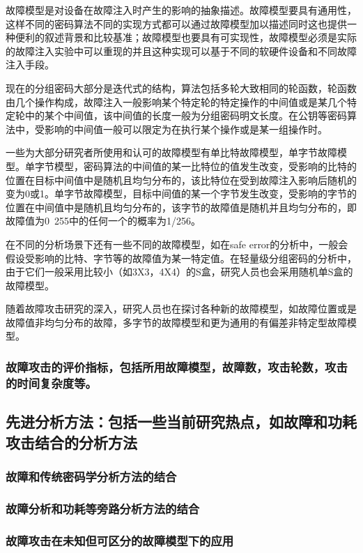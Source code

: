 \documentclass[a4paper,12pt]{article}
\begin{document}
\begin{CJK}{UTF8}{gkai}
故障模型是对设备在故障注入时产生的影响的抽象描述。故障模型要具有通用性，这样不同的密码算法不同的实现方式都可以通过故障模型加以描述同时这也提供一种便利的叙述背景和比较基准；故障模型也要具有可实现性，故障模型必须是实际的故障注入实验中可以重现的并且这种实现可以基于不同的软硬件设备和不同故障注入手段。

现在的分组密码大部分是迭代式的结构，算法包括多轮大致相同的轮函数，轮函数由几个操作构成，故障注入一般影响某个特定轮的特定操作的中间值或是某几个特定轮中的某个中间值，该中间值的长度一般为分组密码明文长度。在公钥等密码算法中，受影响的中间值一般可以限定为在执行某个操作或是某一组操作时。

一些为大部分研究者所使用和认可的故障模型有单比特故障模型，单字节故障模型。单字节模型，密码算法的中间值的某一比特位的值发生改变，受影响的比特的位置在目标中间值中是随机且均匀分布的，该比特位在受到故障注入影响后随机的变为0或1。单字节故障模型，目标中间值的某一个字节发生改变，受影响的字节的位置在中间值中是随机且均匀分布的，该字节的故障值是随机并且均匀分布的，即故障值为0~255中的任何一个的概率为1/256。

在不同的分析场景下还有一些不同的故障模型，如在safe  error的分析中，一般会假设受影响的比特、字节等的故障值为某一特定值。在轻量级分组密码的分析中，由于它们一般采用比较小（如3X3，4X4）的S盒，研究人员也会采用随机单S盒的故障模型。

随着故障攻击研究的深入，研究人员也在探讨各种新的故障模型，如故障位置或是故障值非均匀分布的故障，多字节的故障模型和更为通用的有偏差非特定型故障模型。

\subsubsection{故障攻击的评价指标，包括所用故障模型，故障数，攻击轮数，攻击的时间复杂度等。}
\subsection{先进分析方法：包括一些当前研究热点，如故障和功耗攻击结合的分析方法}
\subsubsection{故障和传统密码学分析方法的结合}
\subsubsection{故障分析和功耗等旁路分析方法的结合}
\subsubsection{故障攻击在未知但可区分的故障模型下的应用}

\end{CJK}
\end{document}
